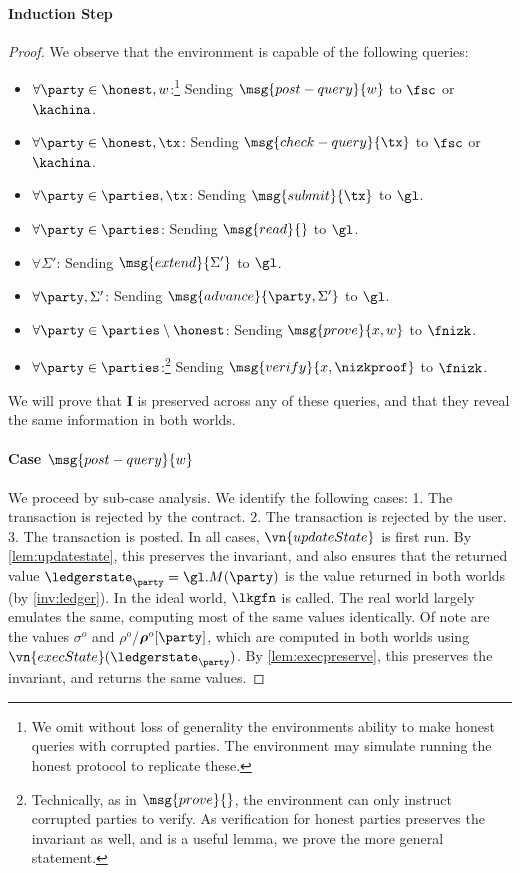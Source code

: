 \paragraph{Induction Step}

\begin{proof}
We observe that the environment is capable of the following queries:

\begin{itemize}
\item $\forall \party \in \honest, w$:\footnote{We omit without loss of
    generality the environments ability to make honest queries with corrupted
    parties. The environment may simulate running the honest protocol to
    replicate these.} Sending $\msg{post-query}{w}$ to $\fsc$ or
  $\allowbreak\kachina$.
\item $\forall \party \in \honest, \tx$: Sending $\msg{check-query}{\tx}$ to
  $\fsc$ or $\allowbreak\kachina$.
\item $\forall \party \in \parties, \tx$: Sending $\msg{submit}{\tx}$ to $\gl$.
\item $\forall \party \in \parties$: Sending $\msg{read}{}$ to $\gl$.
\item $\forall \Sigma'$: Sending $\msg{extend}{\Sigma'}$ to $\gl$.
\item $\forall \party, \Sigma'$: Sending $\msg{advance}{\party, \Sigma'}$ to
  $\gl$.
\item $\forall \party \in \parties \setminus \honest$: Sending $\msg{prove}{x,
    w}$ to $\fnizk$.
\item $\forall \party \in \parties$:\footnote{Technically, as in
    $\msg{prove}{}$, the environment can only instruct corrupted parties to
    verify. As verification for honest parties preserves the invariant as well,
    and is a useful lemma, we prove the more general statement.} Sending
  $\msg{verify}{x, \nizkproof}$ to $\fnizk$.
\end{itemize}

We will prove that $\boldsymbol I$ is preserved across any of these queries, and
that they reveal the same information in both worlds.

\paragraph{Case {\normalfont$\msg{post-query}{w}$}}

We proceed by sub-case analysis. We identify the following cases: 1. The
transaction is rejected by the contract. 2. The transaction is rejected by the
user. 3. The transaction is posted. In all cases, $\vn{updateState}$ is first
run. By \autoref{lem:updatestate}, this preserves the invariant, and also
ensures that the returned value $\ledgerstate_\party = \gl.M(\party)$ is the
value returned in both worlds (by \ref{inv:ledger}). In the ideal world,
$\lkgfn$ is called. The real world largely emulates the same, computing most of
the same values identically. Of note are the values $\sigma^o$ and
$\rho^o$/$\boldsymbol\rho^o[\party]$, which are computed in both worlds using
$\vn{execState}(\ledgerstate_\party)$. By \autoref{lem:execpreserve}, this
preserves the invariant, and returns the same values.


\end{proof}
